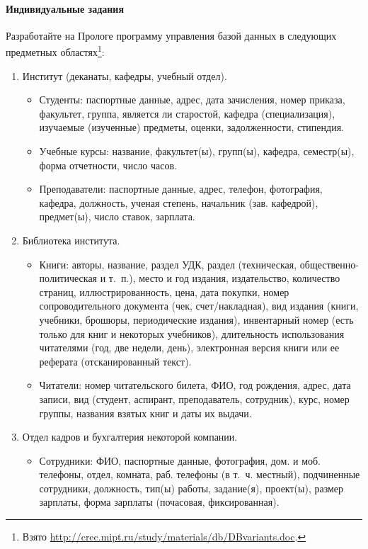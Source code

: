 \documentclass[12pt, openany, twoside]{book} %
\begin{document}
\paragraph{Индивидуальные задания}
Разработайте на Прологе программу управления базой данных в следующих предметных областях\footnote{Взято \url{http://crec.mipt.ru/study/materials/db/DBvariants.doc}.}:
\begin{enumerate}
\item Институт (деканаты, кафедры, учебный отдел).
\begin{itemize}
\item Студенты: паспортные данные, адрес, дата зачисления, номер приказа, факультет, группа, является ли старостой, кафедра (специализация), изучаемые (изученные) предметы, оценки, задолженности, стипендия.
\item Учебные курсы: название, факультет(ы), групп(ы), кафедра, семестр(ы), форма отчетности, число часов.
\item Преподаватели: паспортные данные, адрес, телефон, фотография, кафедра, должность, ученая степень, начальник (зав. кафедрой), предмет(ы), число ставок, зарплата.
\end{itemize}
\item Библиотека института.
\begin{itemize}
\item Книги: авторы, название, раздел УДК, раздел (техническая, общественно-политическая и т.~п.), место и год издания, издательство, количество страниц, иллюстрированность, цена, дата покупки, номер сопроводительного документа (чек, счет/накладная), вид издания (книги, учебники, брошюры, периодические издания), инвентарный номер (есть только для книг и некоторых учебников), длительность использования читателями (год, две недели, день), электронная версия книги или ее реферата (отсканированный текст).
\item Читатели: номер читательского билета, ФИО, год рождения, адрес, дата записи, вид (студент, аспирант, преподаватель, сотрудник), курс, номер группы, названия взятых книг и даты их выдачи.
\end{itemize}
\item Отдел кадров и бухгалтерия некоторой компании.
\begin{itemize}
\item Сотрудники: ФИО, паспортные данные, фотография, дом. и моб. телефоны, отдел, комната, раб. телефоны (в т.~ч. местный), подчиненные сотрудники, должность, тип(ы) работы, задание(я), проект(ы), размер зарплаты, форма зарплаты (почасовая, фиксированная).

\end{itemize}
\end{enumerate}
\end{document}
